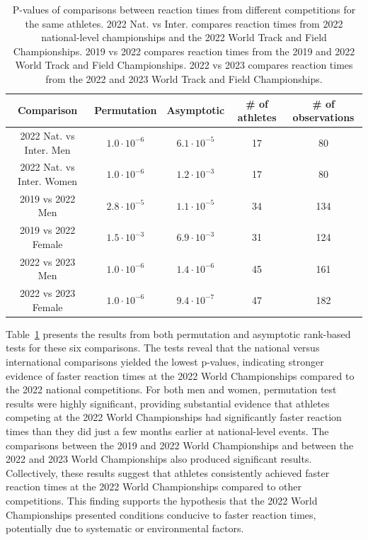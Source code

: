 \documentclass[12pt, letterpaper]{article}
\begin{document}
\begin{table}
  \centering
  \caption{P-values of comparisons between 
    reaction times from different competitions for the same athletes. 
    2022 Nat. vs Inter. compares reaction times from 2022 national-level 
    championships and the 2022 World Track and Field Championships. 2019 
    vs 2022 compares reaction times from the 2019 and 2022 World Track and 
    Field Championships. 2022 vs 2023 compares reaction times from the 
    2022 and 2023 World Track and Field Championships.}
  \begin{tabular}{c c c c c} 
   \toprule
   Comparison & Permutation & Asymptotic & \# of athletes & \# of observations  \\ 
   \midrule
   2022 Nat. vs Inter. Men & $1.0 \cdot 10^{-6}$ & $ 6.1 \cdot 10^{-5}$ & 17 & 80 \\
   2022 Nat. vs Inter. Women & $1.0 \cdot 10^{-6}$ & $ 1.2 \cdot 10^{-3}$ & 17 & 80 \\[1ex]
   2019 vs 2022 Men & $2.8 \cdot 10^{-5}$ & $1.1 \cdot 10^{-5}$ & 34 & 134 \\
   2019 vs 2022 Female & $ 1.5 \cdot 10^{-3}$ & $6.9 \cdot 10^{-3}$ & 31 & 124 \\[1ex]
   2022 vs 2023 Men & $1.0 \cdot 10^{-6}$ & $1.4 \cdot 10^{-6}$ & 45 & 161 \\
   2022 vs 2023 Female & $1.0 \cdot 10^{-6}$ & $9.4 \cdot 10^{-7}$ & 47 & 182 \\
   \bottomrule
  \end{tabular}
  \label{tab:Clusrankresults}
\end{table}



Table~\ref{tab:Clusrankresults} presents the results from both permutation 
and asymptotic rank-based tests for these six comparisons. The tests reveal 
that the national versus international comparisons yielded the lowest 
p-values, indicating stronger evidence of faster reaction times at the 
2022 World Championships compared to the 2022 national competitions. For 
both men and women, permutation test results were highly significant, 
providing substantial evidence that athletes competing at the 2022 World 
Championships had significantly faster reaction times than they did just 
a few months earlier at national-level events. The comparisons between the 
2019 and 2022 World Championships and between the 2022 and 2023 World 
Championships also produced significant results. Collectively, 
these results suggest that athletes consistently achieved faster reaction 
times at the 2022 World Championships compared to other competitions. This 
finding supports the hypothesis that the 2022 World Championships presented 
conditions conducive to faster reaction times, potentially due to systematic 
or environmental factors.
\end{document}

